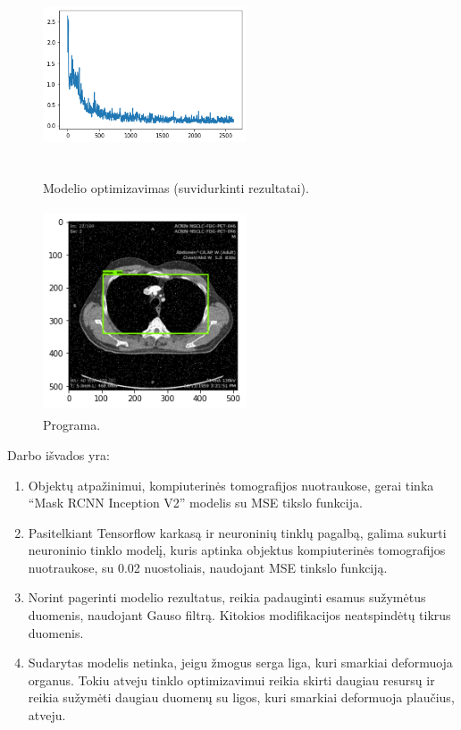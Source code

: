 \documentclass{VUMIFInfKursinis}
\begin{document}
\begin{figure}[ht]
  \centering
  \includegraphics[width=6cm,height=6cm,keepaspectratio]{normalizuotas.png}
  \caption{Modelio optimizavimas (suvidurkinti rezultatai).}
  \label{fig:kaukė1}
\end{figure}

\begin{figure}[ht]
  \centering
  \includegraphics[width=6cm,height=6cm,keepaspectratio]{result1.png}
  \caption{Programa.}
  \label{fig:kaukė1}
\end{figure}

\newpage
\par
Darbo išvados yra:
\begin{enumerate}
\item Objektų atpažinimui, kompiuterinės tomografijos nuotraukose, gerai tinka \enquote{Mask RCNN Inception V2} modelis su MSE tikslo funkcija.
\item Pasitelkiant Tensorflow karkasą ir neuroninių tinklų pagalbą, galima sukurti neuroninio tinklo modelį,
kuris aptinka objektus kompiuterinės tomografijos nuotraukose, su 0.02 nuostoliais, naudojant MSE tinkslo funkciją.
\item Norint pagerinti modelio rezultatus, reikia padauginti esamus sužymėtus duomenis, naudojant Gauso filtrą. Kitokios modifikacijos neatspindėtų tikrus duomenis.
\item Sudarytas modelis netinka, jeigu žmogus serga liga, kuri smarkiai deformuoja organus. Tokiu atveju tinklo optimizavimui reikia skirti daugiau resursų ir reikia sužymėti daugiau duomenų su ligos, kuri smarkiai deformuoja plaučius, atveju.
\end{enumerate}
\end{document}
